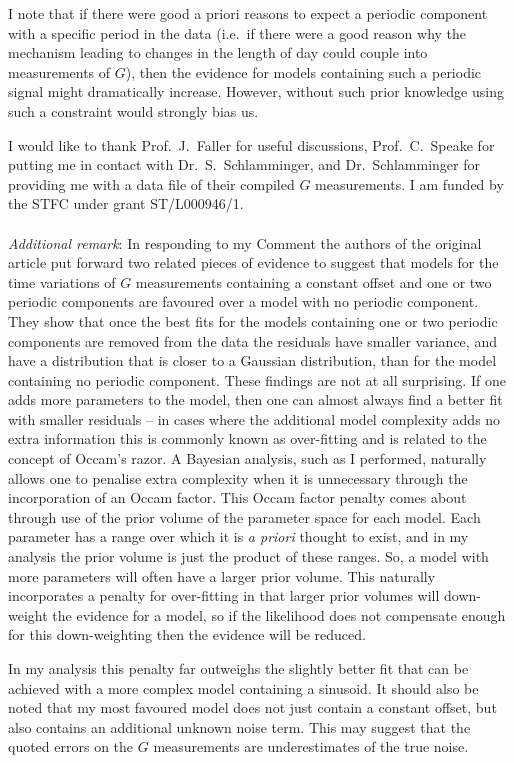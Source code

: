 \documentclass[doublecol]{epl2}
\begin{document}
I note that if there were good a priori reasons to expect a periodic component with a specific period in the data
(i.e.\ if there were a good reason why the mechanism leading to changes in the length of day could couple into 
measurements of
$G$), then the evidence for models containing such a periodic signal might dramatically increase. However, without such
prior knowledge using such a constraint would strongly bias us.

\acknowledgements

I would like to thank Prof.\ J.\ Faller for useful discussions, Prof.\ C.\ Speake for putting me in contact with
Dr.\ S.\ Schlamminger, and Dr.\ Schlamminger for providing me with a data file of their compiled $G$ measurements.
I am funded by the STFC under grant ST/L000946/1.
~\\
~\\
{\it Additional remark}: In responding to my Comment \cite{response} the authors of the original article put forward two related pieces of 
evidence to suggest that models for the time variations of $G$ measurements containing a constant 
offset and one or two periodic components are favoured over a model with no periodic component. 
They show that once the best fits for the models containing one or two periodic components are 
removed from the data the residuals have smaller variance, and have a distribution that is closer 
to a Gaussian distribution, than for the model containing no periodic component. These findings are 
not at all surprising.  If one adds more parameters to the model, then one can almost always find a 
better fit with smaller residuals -- in cases where the additional model complexity adds no extra 
information this is commonly known as over-fitting and is related to the concept of Occam's razor. 
A Bayesian analysis, such as I performed, naturally allows one to penalise extra complexity when it 
is unnecessary through the incorporation of an Occam factor. This Occam factor penalty comes 
about through use of the prior volume of the parameter space for each model. Each parameter has a 
range over which it is {\it a priori} thought to exist, and in my analysis the prior volume is 
just the product of these ranges. So, a model with more parameters will often have a larger prior 
volume. This naturally incorporates a penalty for over-fitting in that larger prior volumes will 
down-weight the evidence for a model, so if the likelihood does not compensate enough for this 
down-weighting then the evidence will be reduced.

In my analysis this penalty far outweighs the slightly better fit that can be achieved with a more 
complex model containing a sinusoid. It should also be noted that my most favoured model does not 
just contain a constant offset, but also contains an additional unknown noise term. This may 
suggest that the quoted errors on the $G$ measurements are underestimates of the true noise.
\end{document}
